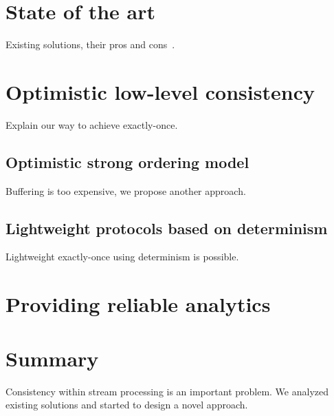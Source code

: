 \documentclass{llncs}
\begin{document}

\section {State of the art}
\label{related}
Existing solutions, their pros and cons~\cite{Carbone:2017:SMA:3137765.3137777, Zaharia:2012:DSE:2342763.2342773}. 

\section {Optimistic low-level consistency}
\label{optimistic}
Explain our way to achieve exactly-once.

\subsection{Optimistic strong ordering model}
Buffering is too expensive, we propose another approach.

\subsection{Lightweight protocols based on determinism}
Lightweight exactly-once using determinism is possible. 

\section{Providing reliable analytics}
\label{reliable}

\section {Summary}
\label{summary}
Consistency within stream processing is an important problem. We analyzed existing solutions and started to design a novel approach.



\end{document}
